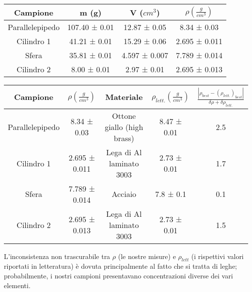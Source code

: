 \documentclass{article}
\begin{document}
\begin{center}
    \begin{tabular}{ |c|c|c|c| }
        \hline
        Campione & m (g) & V ($cm^3$) & $\rho \left(\frac{g}{cm^3}\right)$ \\
        \hline
        Parallelepipedo & 107.40 ± 0.01 & 12.87 ± 0.05 & 8.34 ± 0.03 \\
        Cilindro 1 & 41.21 ± 0.01 & 15.29 ± 0.06 & 2.695 ± 0.011 \\
        Sfera & 35.81 ± 0.01 & 4.597 ± 0.007 & 7.789 ± 0.014 \\
        Cilindro 2 & 8.00 ± 0.01 & 2.97 ± 0.01 & 2.695 ± 0.013 \\
        \hline
    \end{tabular}

    \begin{tabular}{ |c|c|c|c|c| }
        \hline
        Campione & $\rho \left(\frac{g}{cm^3}\right)$ & Materiale & $\rho_{lett.} \left(\frac{g}{cm^3}\right)$ & $\frac{\left|\rho_{best} - \left(\rho_{lett.}\right)_{best}\right|}{\delta \rho + \delta \rho_{lett.}}$ \\
        \hline
        Parallelepipedo & 8.34 ± 0.03 & Ottone giallo (high brass) & 8.47 ± 0.01 & 2.5 \\
        \hline
        Cilindro 1 & 2.695 ± 0.011 & Lega di Al laminato 3003 & 2.73 ± 0.01 & 1.7 \\
        \hline
        Sfera & 7.789 ± 0.014 & Acciaio & 7.8 ± 0.1 & 0.1 \\
        \hline
        Cilindro 2 & 2.695 ± 0.013 & Lega di Al laminato 3003 & 2.73 ± 0.01 & 1.5 \\
        \hline
    \end{tabular}
\end{center}

L'inconsistenza non trascurabile tra $\rho$ (le nostre misure) e $\rho_{lett}$ (i rispettivi valori riportati in letteratura) è dovuta principalmente al fatto che si tratta di leghe; probabilmente, i nostri campioni presentavano concentrazioni diverse dei vari elementi.
\end{document}

